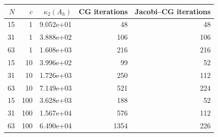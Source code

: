 \begin{tabular}{rrrrr}
\toprule
$N$ & $c$ & $\kappa_2(A_h)$ & CG iterations & Jacobi--CG iterations\\
\midrule
15 & 1 & 9.052e+01 & 48 & 48\\
31 & 1 & 3.888e+02 & 106 & 106\\
63 & 1 & 1.608e+03 & 216 & 216\\
15 & 10 & 3.996e+02 & 99 & 52\\
31 & 10 & 1.726e+03 & 250 & 112\\
63 & 10 & 7.149e+03 & 521 & 224\\
15 & 100 & 3.628e+03 & 188 & 52\\
31 & 100 & 1.567e+04 & 576 & 112\\
63 & 100 & 6.490e+04 & 1354 & 226\\
\bottomrule
\end{tabular}
